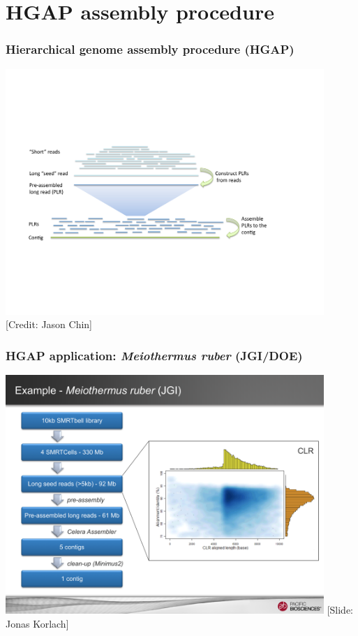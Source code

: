 \documentclass[serif,11pt]{beamer}
\begin{document}
\section{HGAP assembly procedure}
\label{sec-5}
\begin{frame}

   \sectionpage
\end{frame}
\begin{frame}
\frametitle{Hierarchical genome assembly procedure (HGAP)}
\label{sec-5-1}

   \hspace*{-0.2in}
   \includegraphics[width=4.75in]{img/hgap.pdf}
   \hspace*{0.4in}
\newline \tiny [Credit: Jason Chin]\hspace*{\fill}
\end{frame}
\begin{frame}
\frametitle{HGAP application: \emph{Meiothermus ruber} (JGI/DOE)}
\label{sec-5-2}

   \hspace*{-0.2in}
   \includegraphics[width=4.75in]{img/hgap-mruber1.pdf}
   \hspace*{0.4in}
\newline \tiny [Slide: Jonas Korlach]
\end{frame}
\end{document}
